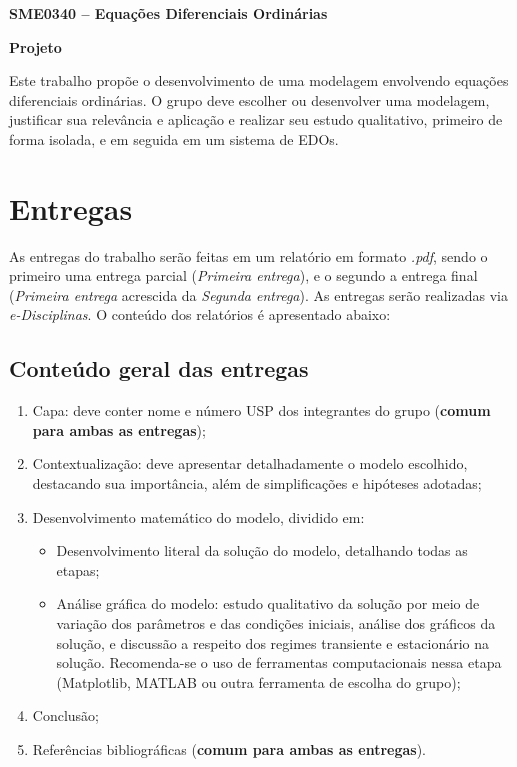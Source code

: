 \documentclass[oneside,12pt,a4paper]{article}
\begin{document}
    \begin{center}
        \fontsize{17.28}{17.28}
            \textbf{SME0340 -- Equações Diferenciais Ordinárias}

            \textbf{Projeto}
    \end{center}

    Este trabalho propõe o desenvolvimento de uma modelagem envolvendo equações diferenciais ordinárias. O grupo deve escolher ou desenvolver uma modelagem, justificar sua relevância e aplicação e realizar seu estudo qualitativo, primeiro de forma isolada, e em seguida em um sistema de EDOs.

    \section{Entregas}

    As entregas do trabalho serão feitas em um relatório em formato \textit{.pdf}, sendo o primeiro uma entrega parcial (\textit{Primeira entrega}), e o segundo a entrega final (\textit{Primeira entrega} acrescida da \textit{Segunda entrega}). As entregas serão realizadas via \textit{e-Disciplinas}. O conteúdo dos relatórios é apresentado abaixo:

    \subsection{Conteúdo geral das entregas}

    \begin{enumerate}
        \item Capa: deve conter nome e número USP dos integrantes do grupo (\textbf{comum para ambas as entregas});
        \item Contextualização: deve apresentar detalhadamente o modelo escolhido, destacando sua importância, além de simplificações e hipóteses adotadas;
        \item Desenvolvimento matemático do modelo, dividido em:
        \begin{itemize}
            \item Desenvolvimento literal da solução do modelo, detalhando todas as etapas;
            \item Análise gráfica do modelo: estudo qualitativo da solução por meio de variação dos parâmetros e das condições iniciais, análise dos gráficos da solução, e discussão a respeito dos regimes transiente e estacionário na solução. Recomenda-se o uso de ferramentas computacionais nessa etapa (Matplotlib, MATLAB ou outra ferramenta de escolha do grupo);
        \end{itemize}
        \item Conclusão;
        \item Referências bibliográficas (\textbf{comum para ambas as entregas}).
    \end{enumerate}
\end{document}
